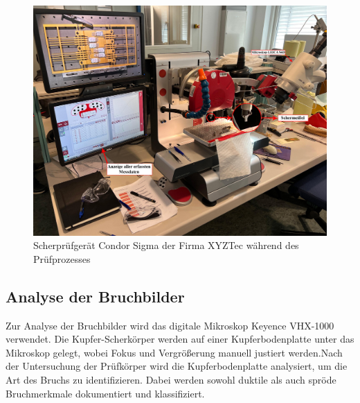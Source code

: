 \begin{figure}[H]
    \centering
    \includegraphics[scale=0.2]{Bilder/WhatsApp Image 2025-03-28 at 17.45.42.jpeg}
    \caption{Scherprüfgerät Condor Sigma der Firma XYZTec während des Prüfprozesses}
    \label{CondorSigma}
\end{figure}

\subsection{Analyse der Bruchbilder}
Zur Analyse der Bruchbilder wird das digitale Mikroskop Keyence VHX-1000 verwendet. Die Kupfer-Scherkörper werden auf einer Kupferbodenplatte unter das Mikroskop gelegt, wobei Fokus und Vergrößerung manuell justiert werden.Nach der Untersuchung der Prüfkörper wird die Kupferbodenplatte analysiert, um die Art des Bruchs zu identifizieren. Dabei werden sowohl duktile als auch spröde Bruchmerkmale dokumentiert und klassifiziert.
